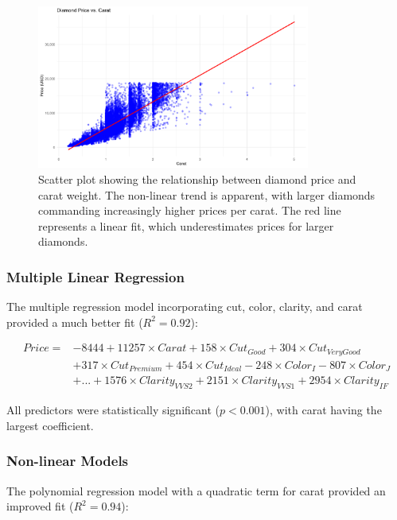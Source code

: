 \documentclass[11pt,a4paper]{article}
\begin{document}
\begin{figure}[H]
    \centering
    \includegraphics[width=0.8\textwidth]{price_vs_carat_scatter.png}
    \caption{Scatter plot showing the relationship between diamond price and carat weight. The non-linear trend is apparent, with larger diamonds commanding increasingly higher prices per carat. The red line represents a linear fit, which underestimates prices for larger diamonds.}
    \label{fig:price_vs_carat}
\end{figure}

\subsubsection{Multiple Linear Regression}

The multiple regression model incorporating cut, color, clarity, and carat provided a much better fit ($R^2 = 0.92$):

\begin{equation}
\begin{split}
Price = &-8444 + 11257 \times Carat + 158 \times Cut_{Good} + 304 \times Cut_{VeryGood} \\
&+ 317 \times Cut_{Premium} + 454 \times Cut_{Ideal} - 248 \times Color_I - 807 \times Color_J \\
&+ ... + 1576 \times Clarity_{VVS2} + 2151 \times Clarity_{VVS1} + 2954 \times Clarity_{IF}
\end{split}
\end{equation}

All predictors were statistically significant ($p < 0.001$), with carat having the largest coefficient.

\subsubsection{Non-linear Models}

The polynomial regression model with a quadratic term for carat provided an improved fit ($R^2 = 0.94$):
\end{document}
